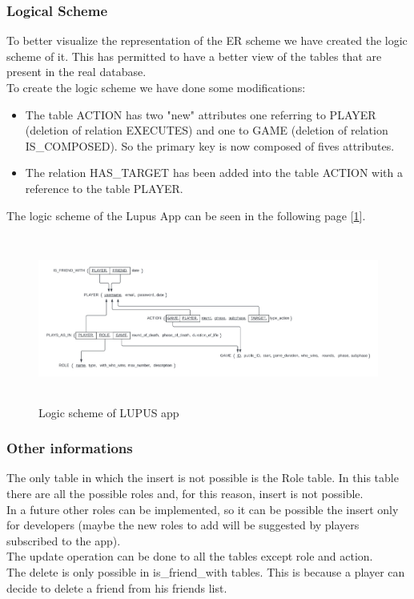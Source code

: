 \subsubsection{Logical Scheme}
To better visualize the representation of the ER scheme we have created the logic scheme of it. This has permitted to have a better view of the tables that are present in the real database. \\
To create the logic scheme we have done some modifications:
\begin{itemize}
    \item The table ACTION has two "new" attributes one referring to PLAYER (deletion of relation EXECUTES) and one to GAME (deletion of relation IS\_COMPOSED). So the primary key is now composed of fives attributes.
    \item The relation HAS\_TARGET has been added into the table ACTION with a reference to the table PLAYER.
\end{itemize}

The logic scheme of the Lupus App can be seen in the following page [\ref{fig:logic_scheme}].
\begin{figure}[htbp] 
    \centering
    \includegraphics[width=\textwidth, height=5.5cm]{images/scheme/logic_scheme.jpeg}
    \caption{Logic scheme of LUPUS app}
    \label{fig:logic_scheme}
\end{figure}


\subsubsection{Other informations}
The only table in which the insert is not possible is the Role table. In this table there are all the possible roles and, for this reason, insert is not possible. \\
In a future other roles can be implemented, so it can be possible the insert only for developers (maybe the new roles to add will be suggested by players subscribed to the app). \\
The update operation can be done to all the tables except role and action.\\
The delete is only possible in is\_friend\_with tables. This is because a player can decide to delete a friend from his friends list.

